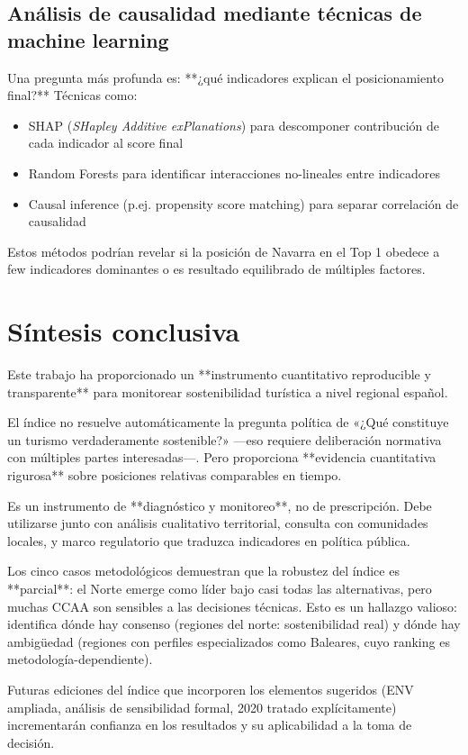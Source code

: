 \subsection{Análisis de causalidad mediante técnicas de machine learning}

Una pregunta más profunda es: **¿qué indicadores explican el posicionamiento final?** Técnicas como:
\begin{itemize}
    \item SHAP (\emph{SHapley Additive exPlanations}) para descomponer contribución de cada indicador al score final
    \item Random Forests para identificar interacciones no-lineales entre indicadores
    \item Causal inference (p.ej. propensity score matching) para separar correlación de causalidad
\end{itemize}

Estos métodos podrían revelar si la posición de Navarra en el Top 1 obedece a few indicadores dominantes o es resultado equilibrado de múltiples factores.

\section{Síntesis conclusiva}

Este trabajo ha proporcionado un **instrumento cuantitativo reproducible y transparente** para monitorear sostenibilidad turística a nivel regional español. 

El índice no resuelve automáticamente la pregunta política de «¿Qué constituye un turismo verdaderamente sostenible?» —eso requiere deliberación normativa con múltiples partes interesadas—. Pero proporciona **evidencia cuantitativa rigurosa** sobre posiciones relativas comparables en tiempo.

Es un instrumento de **diagnóstico y monitoreo**, no de prescripción. Debe utilizarse junto con análisis cualitativo territorial, consulta con comunidades locales, y marco regulatorio que traduzca indicadores en política pública.

Los cinco casos metodológicos demuestran que la robustez del índice es **parcial**: el Norte emerge como líder bajo casi todas las alternativas, pero muchas CCAA son sensibles a las decisiones técnicas. Esto es un hallazgo valioso: identifica dónde hay consenso (regiones del norte: sostenibilidad real) y dónde hay ambigüedad (regiones con perfiles especializados como Baleares, cuyo ranking es metodología-dependiente).

Futuras ediciones del índice que incorporen los elementos sugeridos (ENV ampliada, análisis de sensibilidad formal, 2020 tratado explícitamente) incrementarán confianza en los resultados y su aplicabilidad a la toma de decisión.


